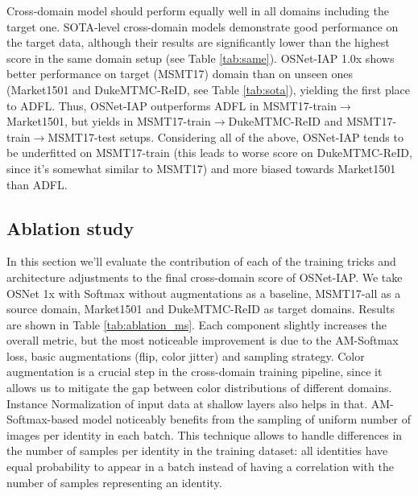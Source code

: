\documentclass[a4paper,conference]{IEEEtran}
\begin{document}
Cross-domain model should perform equally well in all domains including the
target one. SOTA-level cross-domain models demonstrate good performance on the
target data, although their results are significantly lower than the highest
score in the same domain setup (see Table \ref{tab:same}).  OSNet-IAP 1.0x shows
better performance on target (MSMT17) domain than on unseen ones (Market1501 and
DukeMTMC-ReID, see Table \ref{tab:sota}), yielding the first place to
ADFL. Thus, OSNet-IAP outperforms ADFL in MSMT17-train$\rightarrow$Market1501,
but yields in MSMT17-train$\rightarrow$DukeMTMC-ReID and
MSMT17-train$\rightarrow$MSMT17-test setups.  Considering all of the above,
OSNet-IAP tends to be underfitted on MSMT17-train (this leads to worse score on
DukeMTMC-ReID, since it's somewhat similar to MSMT17) and more biased towards
Market1501 than ADFL.

\subsection{Ablation study}
\label{subsec:ablation}

In this section we'll evaluate the contribution of each of the training tricks
and architecture adjustments to the final cross-domain score of OSNet-IAP. We
take OSNet 1x with Softmax without augmentations as a baseline, MSMT17-all as a
source domain, Market1501 and DukeMTMC-ReID as target domains. Results are shown
in Table \ref{tab:ablation_ms}.  Each component slightly increases the overall
metric, but the most noticeable improvement is due to the AM-Softmax loss, basic
augmentations (flip, color jitter) and sampling strategy.  Color augmentation is
a crucial step in the cross-domain training pipeline, since it allows us to mitigate the gap
between color distributions of different domains. Instance Normalization of
input data at shallow layers also helps in that. AM-Softmax-based model
noticeably benefits from the sampling of uniform number of images per identity
in each batch.  This technique allows to handle differences in the number of
samples per identity in the training dataset: all identities have equal
probability to appear in a batch instead of having a correlation with the number
of samples representing an identity.
\end{document}
